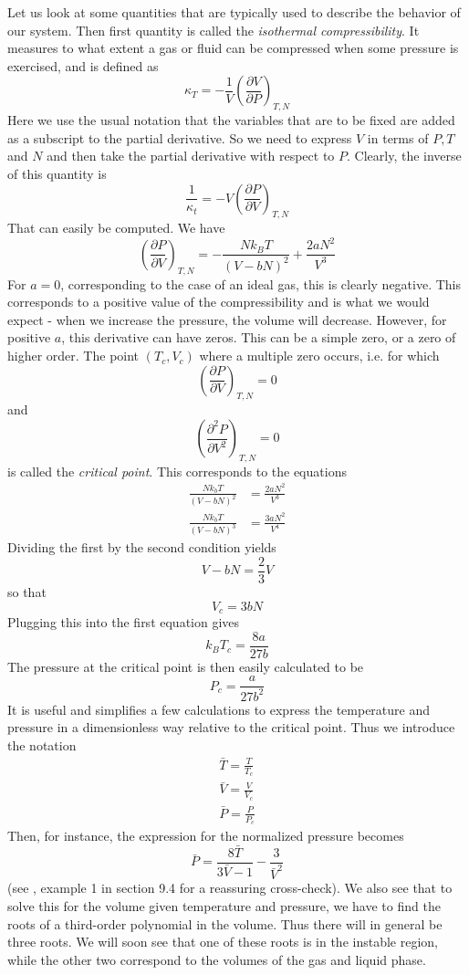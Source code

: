 \documentclass[a4paper, draft]{article}
\theoremstyle{own}
\theoremstyle{remark}
\begin{document}
Let us look at some quantities that are typically used to describe the behavior of our system. Then first quantity is called the {\em isothermal compressibility}. It measures to what extent a gas or fluid can be compressed when some pressure is exercised, and is defined as
$$
\kappa_T = - \frac{1}{V}  (\frac{\partial V}{\partial P})_{T,N}
$$
Here we use the usual notation that the variables that are to be fixed are added as a subscript to the partial derivative. So we need to express $V$ in terms of $P,T$ and $N$ and then take the partial derivative with respect to $P$. Clearly, the inverse of this quantity is
$$
\frac{1}{\kappa_t} = - V  (\frac{\partial P}{\partial V})_{T,N}
$$
That can easily be computed. We have
$$
(\frac{\partial P}{\partial V})_{T,N} = - \frac{N k_B T}{(V - bN)^2} + \frac{2aN^2}{V^3}
$$
For $a = 0$, corresponding to the case of an ideal gas, this is clearly negative. This corresponds to a positive value of the compressibility and is what we would expect - when we increase the pressure, the volume will decrease. However, for positive $a$, this derivative can have zeros. This can be a simple zero, or a zero of higher order. The point $(T_c, V_c)$ where a multiple zero occurs, i.e. for which
$$
(\frac{\partial P}{\partial V})_{T,N}  = 0
$$
and
$$
(\frac{\partial^2 P}{\partial V^2})_{T,N}  = 0
$$
is called the {\em critical point}. This corresponds to the equations
\begin{align*}
\frac{N k_b T}{(V-bN)^2} &= \frac{2aN^2}{V^3} \\
\frac{N k_b T}{(V-bN)^3} &= \frac{3aN^2}{V^4} 
\end{align*}
Dividing the first by the second condition yields
$$
V - bN = \frac{2}{3} V
$$
so that 
$$
V_c = 3 b N
$$
Plugging this into the first equation gives
$$
k_B T_c =  \frac{8a}{27b}
$$
The pressure at the critical point is then easily calculated to be
$$
P_c = \frac{a}{27b^2}
$$
It is useful and simplifies a few calculations to express the temperature and pressure in a dimensionless way relative to the critical point. Thus we introduce the notation
\begin{align*}
\bar{T} = \frac{T}{T_c} \\
\bar{V} = \frac{V}{V_c} \\
\bar{P} = \frac{P	}{P_c} 
\end{align*}
Then, for instance, the expression for the normalized pressure becomes
$$
\bar{P} = \frac{8 \bar{T}}{3 \bar{V}-1} - \frac{3}{\bar{V}^2}
$$
(see \cite{Callen}, example 1 in section 9.4 for a reassuring cross-check).
We also see that to solve this for the volume given temperature and pressure, we have to find the roots of a third-order polynomial in the volume. Thus there will in general be three roots. We will soon see that one of these roots is in the instable region, while the other two correspond to the volumes of the gas and liquid phase.
\end{document}
